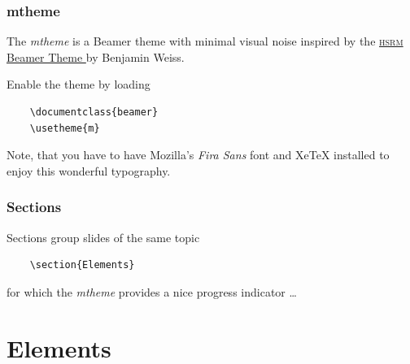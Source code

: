 \documentclass[10pt, compress]{beamer}
\newcommand{\ehref}[2]{\href{#1}{#2 \hspace{-.2em}{\scriptsize\faExternalLink}}}
\begin{document}

\begin{frame}[fragile]
  \frametitle{mtheme}

  The \emph{mtheme} is a Beamer theme with minimal visual noise inspired by the
  \ehref{https://github.com/hsrmbeamertheme/hsrmbeamertheme}{\textsc{hsrm} Beamer
  Theme} by Benjamin Weiss.

  Enable the theme by loading \faFrown

  \begin{verbatim}
    \documentclass{beamer}
    \usetheme{m}
  \end{verbatim}

  Note, that you have to have Mozilla's \emph{Fira Sans} font and XeTeX
  installed to enjoy this wonderful typography.
\end{frame}

\begin{frame}[fragile]
  \frametitle{Sections}
  Sections group slides of the same topic

  \begin{verbatim}
    \section{Elements}
  \end{verbatim}

  for which the \emph{mtheme} provides a nice progress indicator \ldots
\end{frame}

\section{Elements}
\end{document}
